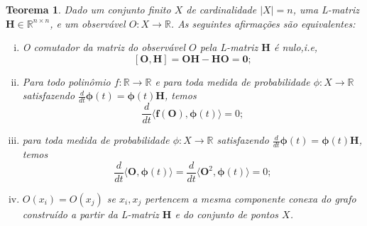 \documentclass[twoside,openright,titlepage,numbers=noenddot,headinclude,  lineheaders footinclude=true,cleardoublepage=empty,
                                BCOR=5mm,paper=a4,fontsize=12pt ]{scrbook}
\newtheorem{teo}{Teorema}[chapter]
\theoremstyle{definition}
\begin{document}
\begin{teo}
Dado um conjunto finito $X$ de cardinalidade
$|X| = n$, uma L-matriz $\bm{H} \in \mathbb{R}^{n \times n}$,
e um observável $O: X \rightarrow \mathbb{R}$. As seguintes afirmações
são equivalentes:
\begin{enumerate}[(i)]
\item O comutador da matriz do observável $O$ pela L-matriz $\bm{H}$ é
nulo,i.e, 
\[ [\bm{O}, \bm{H}] = \bm{O}\bm{H} - \bm{H}\bm{O} = \bm{0}; \]
\item Para todo polinômio $f: \mathbb{R} \rightarrow \mathbb{R}$ e
para toda medida de probabilidade $\phi: X \rightarrow \mathbb{R}$
satisfazendo $\frac{d}{dt}\bm{\phi}(t) = \bm{\phi}(t)\bm{H}$, temos
\[
\frac{d}{dt} \langle \bm{f(O)}, \bm{\phi}(t) \rangle = 0;
\]
\item para toda medida de probabilidade $\phi: X \rightarrow \mathbb{R}$
satisfazendo $\frac{d}{dt}\bm{\phi}(t) = \bm{\phi}(t)\bm{H}$, temos
\[
\frac{d}{dt} \langle\bm{O}, \bm{\phi}(t) \rangle = 
\frac{d}{dt} \langle\bm{O}^2, \bm{\phi}(t) \rangle = 0;
\]
\item $O(x_i) = O(x_j)$ se $x_i, x_j$ pertencem a mesma componente conexa
do grafo construído a partir da L-matriz $\bm{H}$ e do conjunto de pontos
$X$.
\end{enumerate}
\end{teo}
\end{document}
